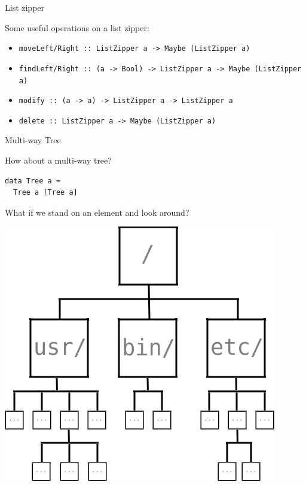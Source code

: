\begin{frame}[fragile]
\begin{block}{List zipper}
\begin{center}
Some useful operations on a list zipper:
\begin{itemize}
  \item \tiny{\lstinline{moveLeft/Right :: ListZipper a -> Maybe (ListZipper a)}}
  \item \tiny{\lstinline{findLeft/Right :: (a -> Bool) -> ListZipper a -> Maybe (ListZipper a)}}
  \item \tiny{\lstinline{modify :: (a -> a) -> ListZipper a -> ListZipper a}}
  \item \tiny{\lstinline{delete :: ListZipper a -> Maybe (ListZipper a)}}
\end{itemize}
\end{center}
\end{block}
\end{frame}

\begin{frame}[fragile]
\begin{block}{Multi-way Tree}
\begin{center}
How about a multi-way tree?
\end{center}
\end{block}
\begin{center}
\begin{lstlisting}[style=haskell]
data Tree a =
  Tree a [Tree a]
\end{lstlisting}
\end{center}
\end{frame}

\begin{frame}[fragile]
\begin{block}{What if we stand on an element and look around?}
\begin{center}
\includegraphics[width=0.60\textheight]{image/rosetree.png}
\end{center}
\end{block}
\end{frame}

